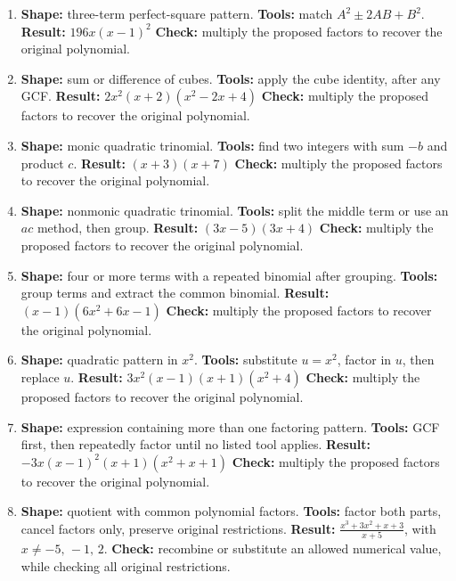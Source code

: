 \documentclass[11pt,oneside]{book}
\begin{document}
\begin{enumerate}[leftmargin=*,label=\textbf{CAP\arabic*.},itemsep=0.45\baselineskip]
\item \textbf{Shape:} three-term perfect-square pattern. \textbf{Tools:} match $A^2\pm2AB+B^2$. \textbf{Result:} $ 196 x \left(x - 1\right)^{2} $ \textbf{Check:} multiply the proposed factors to recover the original polynomial.
\item \textbf{Shape:} sum or difference of cubes. \textbf{Tools:} apply the cube identity, after any GCF. \textbf{Result:} $ 2 x^{2} \left(x + 2\right) \left(x^{2} - 2 x + 4\right) $ \textbf{Check:} multiply the proposed factors to recover the original polynomial.
\item \textbf{Shape:} monic quadratic trinomial. \textbf{Tools:} find two integers with sum $-b$ and product $c$. \textbf{Result:} $ \left(x + 3\right) \left(x + 7\right) $ \textbf{Check:} multiply the proposed factors to recover the original polynomial.
\item \textbf{Shape:} nonmonic quadratic trinomial. \textbf{Tools:} split the middle term or use an $ac$ method, then group. \textbf{Result:} $ \left(3 x - 5\right) \left(3 x + 4\right) $ \textbf{Check:} multiply the proposed factors to recover the original polynomial.
\item \textbf{Shape:} four or more terms with a repeated binomial after grouping. \textbf{Tools:} group terms and extract the common binomial. \textbf{Result:} $ \left(x - 1\right) \left(6 x^{2} + 6 x - 1\right) $ \textbf{Check:} multiply the proposed factors to recover the original polynomial.
\item \textbf{Shape:} quadratic pattern in $x^2$. \textbf{Tools:} substitute $u=x^2$, factor in $u$, then replace $u$. \textbf{Result:} $ 3 x^{2} \left(x - 1\right) \left(x + 1\right) \left(x^{2} + 4\right) $ \textbf{Check:} multiply the proposed factors to recover the original polynomial.
\item \textbf{Shape:} expression containing more than one factoring pattern. \textbf{Tools:} GCF first, then repeatedly factor until no listed tool applies. \textbf{Result:} $ - 3 x \left(x - 1\right)^{2} \left(x + 1\right) \left(x^{2} + x + 1\right) $ \textbf{Check:} multiply the proposed factors to recover the original polynomial.
\item \textbf{Shape:} quotient with common polynomial factors. \textbf{Tools:} factor both parts, cancel factors only, preserve original restrictions. \textbf{Result:} $\displaystyle \frac{x^{3} + 3 x^{2} + x + 3}{x + 5}$, with $x\ne -5,\,-1,\,2$. \textbf{Check:} recombine or substitute an allowed numerical value, while checking all original restrictions.

\end{enumerate}
\end{document}
